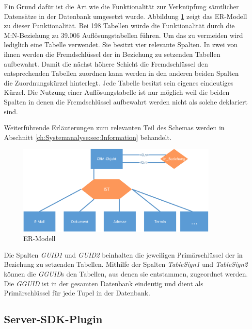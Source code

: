 Ein Grund dafür ist die Art wie die Funktionalität zur Verknüpfung sämtlicher Datensätze in der Datenbank umgesetzt wurde. Abbildung \ref{gw_2} zeigt das ER-Modell zu dieser Funktionalität. Bei 198 Tabellen würde die Funktionalität durch die M:N-Beziehung zu 39.006 Auflösungstabellen führen. Um das zu vermeiden wird lediglich eine Tabelle verwendet. Sie besitzt vier relevante Spalten. In zwei von ihnen werden die Fremdschlüssel der in Beziehung zu setzenden Tabellen aufbewahrt. Damit die nächst höhere Schicht die Fremdschlüssel den entsprechenden Tabellen zuordnen kann werden in den anderen beiden Spalten die Zuordnungskürzel hinterlegt. Jede Tabelle besitzt sein eigenes eindeutiges Kürzel. Die Nutzung einer Auflösungstabelle ist nur möglich weil die beiden Spalten in denen die Fremdschlüssel aufbewahrt werden nicht als solche deklariert sind.

Weiterführende Erläuterungen zum relevanten Teil des Schemas werden in Abschnitt \ref{ch:Systemanalyse:sec:Information} behandelt.

\begin{figure}[ht]
	\centering
  \includegraphics[width=0.9\textwidth, width=0.9\textwidth]{pics/erm.pdf}
	\caption{ER-Modell}
	\label{gw_2}
\end{figure}

Die Spalten \textit{GUID1} und \textit{GUID2} beinhalten die jeweiligen Primärschlüssel der in Beziehung zu setzenden Tabellen. Mithilfe der Spalten \textit{TableSign1} und \textit{TableSign2} können die \textit{GGUID}s den Tabellen, aus denen sie entstammen, zugeordnet werden. Die \textit{GGUID} ist in der gesamten Datenbank eindeutig und dient als Primärschlüssel für jede Tupel in der Datenbank.

\subsection{Server-SDK-Plugin}
\label{ch:Systemanalyse:sec:genesisWorld:subsec:plugin}

